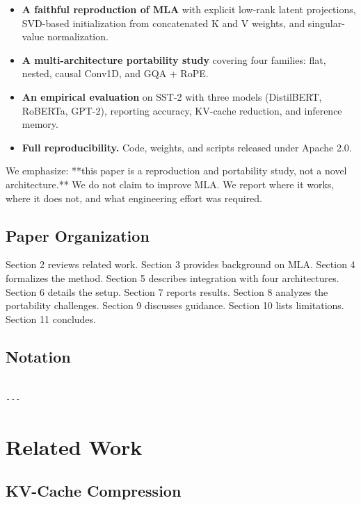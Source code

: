 \begin{itemize}
\item \textbf{A faithful reproduction of MLA} with explicit low-rank latent
  projections, SVD-based initialization from concatenated K and V weights,
  and singular-value normalization.
\item \textbf{A multi-architecture portability study} covering four families: flat,
  nested, causal Conv1D, and GQA + RoPE.
\item \textbf{An empirical evaluation} on SST-2 with three models (DistilBERT,
  RoBERTa, GPT-2), reporting accuracy, KV-cache reduction, and inference
  memory.
\item \textbf{Full reproducibility.} Code, weights, and scripts released under
  Apache 2.0.

\end{itemize}
We emphasize: **this paper is a reproduction and portability study, not a 
novel architecture.** We do not claim to improve MLA. We report where it 
works, where it does not, and what engineering effort was required.

\subsection{Paper Organization}

Section 2 reviews related work. Section 3 provides background on MLA. Section 
4 formalizes the method. Section 5 describes integration with four 
architectures. Section 6 details the setup. Section 7 reports results. 
Section 8 analyzes the portability challenges. Section 9 discusses guidance. 
Section 10 lists limitations. Section 11 concludes.



\subsection{Notation}

\begin{lstlisting}

---
\end{lstlisting}


\section{Related Work}

\subsection{KV-Cache Compression}

